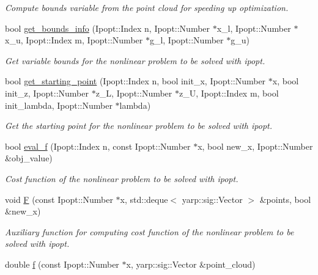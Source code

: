 \begin{DoxyCompactItemize}
\begin{DoxyCompactList}\small\item\em Compute bounds variable from the point cloud for speeding up optimization. \end{DoxyCompactList}\item 
bool \hyperlink{classSuperQuadric__NLP_a9f303ff4d778230990fd151631c2d9d4}{get\-\_\-bounds\-\_\-info} (Ipopt\-::\-Index n, Ipopt\-::\-Number $\ast$x\-\_\-l, Ipopt\-::\-Number $\ast$x\-\_\-u, Ipopt\-::\-Index m, Ipopt\-::\-Number $\ast$g\-\_\-l, Ipopt\-::\-Number $\ast$g\-\_\-u)
\begin{DoxyCompactList}\small\item\em Get variable bounds for the nonlinear problem to be solved with ipopt. \end{DoxyCompactList}\item 
bool \hyperlink{classSuperQuadric__NLP_a05ec724269d1060c5e53112817938639}{get\-\_\-starting\-\_\-point} (Ipopt\-::\-Index n, bool init\-\_\-x, Ipopt\-::\-Number $\ast$x, bool init\-\_\-z, Ipopt\-::\-Number $\ast$z\-\_\-\-L, Ipopt\-::\-Number $\ast$z\-\_\-\-U, Ipopt\-::\-Index m, bool init\-\_\-lambda, Ipopt\-::\-Number $\ast$lambda)
\begin{DoxyCompactList}\small\item\em Get the starting point for the nonlinear problem to be solved with ipopt. \end{DoxyCompactList}\item 
bool \hyperlink{classSuperQuadric__NLP_ab33c41e6fa8674c1434aac9b18a62d37}{eval\-\_\-f} (Ipopt\-::\-Index n, const Ipopt\-::\-Number $\ast$x, bool new\-\_\-x, Ipopt\-::\-Number \&obj\-\_\-value)
\begin{DoxyCompactList}\small\item\em Cost function of the nonlinear problem to be solved with ipopt. \end{DoxyCompactList}\item 
void \hyperlink{classSuperQuadric__NLP_afaecc87e024a55c07d13f45b8e7af173}{F} (const Ipopt\-::\-Number $\ast$x, std\-::deque$<$ yarp\-::sig\-::\-Vector $>$ \&points, bool \&new\-\_\-x)
\begin{DoxyCompactList}\small\item\em Auxiliary function for computing cost function of the nonlinear problem to be solved with ipopt. \end{DoxyCompactList}\item 
double \hyperlink{classSuperQuadric__NLP_a016ed88992ee15c29adf280e56aee0fc}{f} (const Ipopt\-::\-Number $\ast$x, yarp\-::sig\-::\-Vector \&point\-\_\-cloud)

\end{DoxyCompactItemize}

